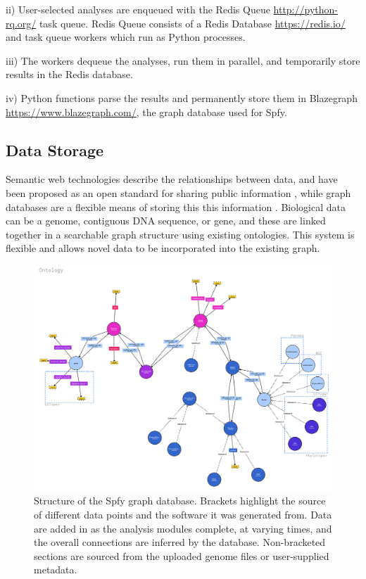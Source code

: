 \documentclass{article}
\begin{document}
ii) User-selected analyses are enqueued with the Redis Queue \url{http://python-rq.org/} task queue. Redis Queue consists of a Redis Database \url{https://redis.io/} and task queue workers which run as Python processes.

iii) The workers dequeue the analyses, run them in parallel, and temporarily store results in the Redis database.

iv) Python functions parse the results and permanently store them in Blazegraph \url{https://www.blazegraph.com/}, the graph database used for Spfy.

\subsection{Data Storage}
Semantic web technologies describe the relationships between data, and have been proposed as an open standard for sharing public information \cite{berners2001semantic}, while graph databases are a flexible means of storing this this information \cite{horrocks2005semantic}. Biological data can be a genome, contiguous DNA sequence, or gene, and these are linked together in a searchable graph structure using existing ontologies. This system is flexible and allows novel data to be incorporated into the existing graph.

\begin{figure}[!hb]
\begin{center}
\includegraphics[width=\textwidth]{images/ontology}
\end{center}
\caption{Structure of the Spfy graph database. Brackets highlight the source of different data points and the software it was generated from. Data are added in as the analysis modules complete, at varying times, and the overall connections are inferred by the database. Non-bracketed sections are sourced from the uploaded genome files or user-supplied metadata.}
\label{fig-ontology}
\end{figure}
\end{document}
